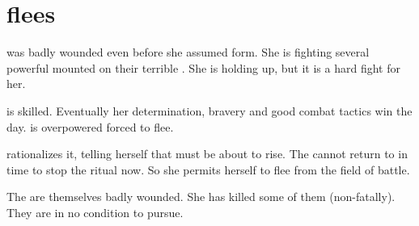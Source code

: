 \begin{prose}
\end{prose}





\section{\Nzessuacrith flees}
\Nzessuacrith was badly wounded even before she assumed \draconian form.
She is fighting several powerful \resphain mounted on their terrible \umbrae. 
She is holding up, but it is a hard fight for her. 

\Achsah is skilled. 
Eventually her determination, bravery and good combat tactics win the day. 
\Nzessuacrith is overpowered forced to flee. 

\Nzessuacrith rationalizes it, telling herself that \Nithdornazsh must be about to rise. 
The \resphain cannot return to \Malcur in time to stop the ritual now. 
So she permits herself to flee from the field of battle. 

The \resphain are themselves badly wounded.
She has killed some of them (non-fatally).
They are in no condition to pursue. 





% 
% 
% 





